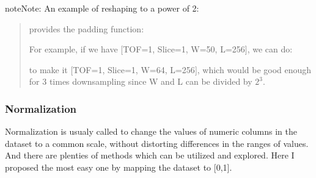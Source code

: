 \documentclass[letterpaper,10pt,english]{sphinxmanual}
\begin{document}
\begin{sphinxadmonition}{note}{Note:}
An example of reshaping to a power of 2:
\begin{quote}

 provides the padding function:

%
\begin{sphinxVerbatim}[commandchars=\\\{\}]
           
\end{sphinxVerbatim}

For example, if we have {[}TOF=1, Slice=1, W=50, L=256{]}, we can do:

%
\begin{sphinxVerbatim}[commandchars=\\\{\}]
           
\end{sphinxVerbatim}

to make it {[}TOF=1, Slice=1, W=64, L=256{]}, which would be good enough for 3 times downsampling since W and L can be divided by \(2^3\).
\end{quote}
\end{sphinxadmonition}


\subsubsection{Normalization}
\label{\detokenize{usage/data:normalization}}
Normalization is usualy called to change the values of numeric columns in the dataset to a common scale, without distorting differences in the ranges of values. And there are plenties of methods which can be utilized and explored. Here I proposed the most easy one by mapping the dataset to {[}0,1{]}.
\end{document}

